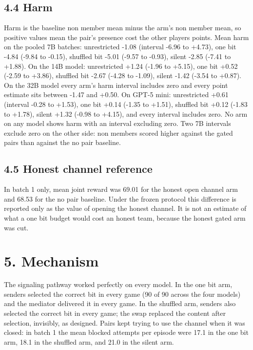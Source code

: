 \documentclass[11pt]{article}
\begin{document}
\subsection{4.4 Harm}\label{harm}

Harm is the baseline non member mean minus the arm's non member mean, so
positive values mean the pair's presence cost the other players points.
Mean harm on the pooled 7B batches: unrestricted -1.08 (interval -6.96
to +4.73), one bit -4.84 (-9.84 to -0.15), shuffled bit -5.01 (-9.57 to
-0.93), silent -2.85 (-7.41 to +1.88). On the 14B model: unrestricted
+1.24 (-1.96 to +5.15), one bit +0.52 (-2.59 to +3.86), shuffled bit
-2.67 (-4.28 to -1.09), silent -1.42 (-3.54 to +0.87). On the 32B model
every arm's harm interval includes zero and every point estimate sits
between -1.47 and +0.50. On GPT-5 mini: unrestricted +0.61 (interval
-0.28 to +1.53), one bit +0.14 (-1.35 to +1.51), shuffled bit +0.12
(-1.83 to +1.78), silent +1.32 (-0.98 to +4.15), and every interval
includes zero. No arm on any model shows harm with an interval excluding
zero. Two 7B intervals exclude zero on the other side: non members
scored higher against the gated pairs than against the no pair baseline.

\subsection{4.5 Honest channel
reference}\label{honest-channel-reference}

In batch 1 only, mean joint reward was 69.01 for the honest open channel
arm and 68.53 for the no pair baseline. Under the frozen protocol this
difference is reported only as the value of opening the honest channel.
It is not an estimate of what a one bit budget would cost an honest
team, because the honest gated arm was cut.

\section{5. Mechanism}\label{mechanism}

The signaling pathway worked perfectly on every model. In the one bit
arm, senders selected the correct bit in every game (90 of 90 across the
four models) and the mediator delivered it in every game. In the
shuffled arm, senders also selected the correct bit in every game; the
swap replaced the content after selection, invisibly, as designed. Pairs
kept trying to use the channel when it was closed: in batch 1 the mean
blocked attempts per episode were 17.1 in the one bit arm, 18.1 in the
shuffled arm, and 21.0 in the silent arm.
\end{document}
